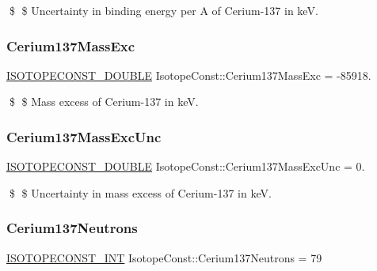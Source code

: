 \$ \$ Uncertainty in binding energy per A of Cerium-\/137 in keV. \mbox{\label{group___isotope_const-_cerium-_ce137_gaa98d9bfdb6961fb1de66593b8763eb1d}} 
\subsubsection{\texorpdfstring{Cerium137\+Mass\+Exc}{Cerium137MassExc}}
{\footnotesize\ttfamily \mbox{\hyperlink{group___isotope_const-_macros_ga8f45a7272ce02c0b4c65c44636ed719a}{I\+S\+O\+T\+O\+P\+E\+C\+O\+N\+S\+T\+\_\+\+D\+O\+U\+B\+LE}} Isotope\+Const\+::\+Cerium137\+Mass\+Exc = -\/85918.}

\$ \$ Mass excess of Cerium-\/137 in keV. \mbox{\label{group___isotope_const-_cerium-_ce137_ga081c24febf1049d045e0c7a2cc1925c1}} 
\subsubsection{\texorpdfstring{Cerium137\+Mass\+Exc\+Unc}{Cerium137MassExcUnc}}
{\footnotesize\ttfamily \mbox{\hyperlink{group___isotope_const-_macros_ga8f45a7272ce02c0b4c65c44636ed719a}{I\+S\+O\+T\+O\+P\+E\+C\+O\+N\+S\+T\+\_\+\+D\+O\+U\+B\+LE}} Isotope\+Const\+::\+Cerium137\+Mass\+Exc\+Unc = 0.}

\$ \$ Uncertainty in mass excess of Cerium-\/137 in keV. \mbox{\label{group___isotope_const-_cerium-_ce137_ga23377c25175b47810b78da77ab370f87}} 
\subsubsection{\texorpdfstring{Cerium137\+Neutrons}{Cerium137Neutrons}}
{\footnotesize\ttfamily \mbox{\hyperlink{group___isotope_const-_macros_ga5f18360b3e99483a35c32d789e62621c}{I\+S\+O\+T\+O\+P\+E\+C\+O\+N\+S\+T\+\_\+\+I\+NT}} Isotope\+Const\+::\+Cerium137\+Neutrons = 79}

